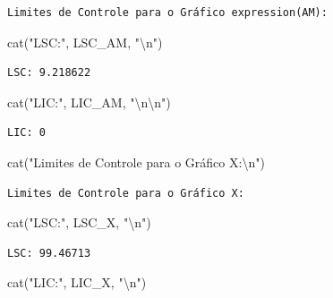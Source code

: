 \documentclass[
  letterpaper,
  DIV=11,
  numbers=noendperiod]{scrartcl}
\newenvironment{Shaded}{\begin{snugshade}}{\end{snugshade}}
\newcommand{\FunctionTok}[1]{\textcolor[rgb]{0.28,0.35,0.67}{#1}}
\newcommand{\NormalTok}[1]{\textcolor[rgb]{0.00,0.23,0.31}{#1}}
\newcommand{\SpecialCharTok}[1]{\textcolor[rgb]{0.37,0.37,0.37}{#1}}
\newcommand{\StringTok}[1]{\textcolor[rgb]{0.13,0.47,0.30}{#1}}
\begin{document}
\begin{verbatim}
Limites de Controle para o Gráfico expression(AM):
\end{verbatim}

\begin{Shaded}
\begin{Highlighting}[]
\FunctionTok{cat}\NormalTok{(}\StringTok{"LSC:"}\NormalTok{, LSC\_AM, }\StringTok{"}\SpecialCharTok{\textbackslash{}n}\StringTok{"}\NormalTok{)}
\end{Highlighting}
\end{Shaded}

\begin{verbatim}
LSC: 9.218622 
\end{verbatim}

\begin{Shaded}
\begin{Highlighting}[]
\FunctionTok{cat}\NormalTok{(}\StringTok{"LIC:"}\NormalTok{, LIC\_AM, }\StringTok{"}\SpecialCharTok{\textbackslash{}n\textbackslash{}n}\StringTok{"}\NormalTok{)}
\end{Highlighting}
\end{Shaded}

\begin{verbatim}
LIC: 0 
\end{verbatim}

\begin{Shaded}
\begin{Highlighting}[]
\FunctionTok{cat}\NormalTok{(}\StringTok{"Limites de Controle para o Gráfico X:}\SpecialCharTok{\textbackslash{}n}\StringTok{"}\NormalTok{)}
\end{Highlighting}
\end{Shaded}

\begin{verbatim}
Limites de Controle para o Gráfico X:
\end{verbatim}

\begin{Shaded}
\begin{Highlighting}[]
\FunctionTok{cat}\NormalTok{(}\StringTok{"LSC:"}\NormalTok{, LSC\_X, }\StringTok{"}\SpecialCharTok{\textbackslash{}n}\StringTok{"}\NormalTok{)}
\end{Highlighting}
\end{Shaded}

\begin{verbatim}
LSC: 99.46713 
\end{verbatim}

\begin{Shaded}
\begin{Highlighting}[]
\FunctionTok{cat}\NormalTok{(}\StringTok{"LIC:"}\NormalTok{, LIC\_X, }\StringTok{"}\SpecialCharTok{\textbackslash{}n}\StringTok{"}\NormalTok{)}
\end{Highlighting}
\end{Shaded}
\end{document}

